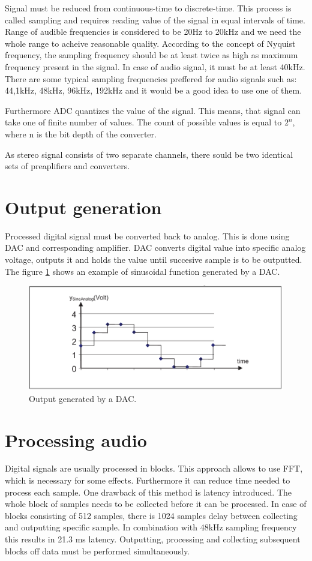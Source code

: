 \documentclass[a4paper,twoside,12pt]{book}
\begin{document}
Signal must be reduced from continuous-time to discrete-time.
This process is called sampling and requires reading value of the signal in equal intervals of time.
Range of audible frequencies is considered to be 20Hz to 20kHz
and we need the whole range to acheive reasonable quality.
According to the concept of Nyquist frequency, the sampling frequency should be at least
twice as high as maximum frequency present in the signal.
In case of audio signal, it must be at least 40kHz.
There are some typical sampling frequencies preffered for audio signals such as: 44,1kHz, 48kHz,
96kHz, 192kHz and it would be a good idea to use one of them.

Furthermore ADC quantizes the value of the signal.
This means, that signal can take one of finite number of values.
The count of possible values is equal to \(2^n\), where n is the bit depth of the converter.

As stereo signal consists of two separate channels,
there sould be two identical sets of preaplifiers and converters.

\section{Output generation}
Processed digital signal must be converted back to analog.
This is done using DAC and corresponding amplifier.
DAC converts digital value into specific analog voltage,
outputs it and holds the value until succesive sample is to be outputted.
The figure \ref{fig:sine} shows an example of sinusoidal
function generated by a DAC.

\begin{figure}[H]
    \centering
    \includegraphics[width=\textwidth]{images/DAC_sine}
    \caption{Output generated by a DAC\cite{ST:DAC2}.}
    \label{fig:sine}
\end{figure}

\section{Processing audio}
Digital signals are usually processed in blocks.
This approach allows to use FFT, which is necessary for some effects.
Furthermore it can reduce time needed to process each sample.
One drawback of this method is latency introduced.
The whole block of samples needs to be collected before it can be processed.
In case of blocks consisting of 512 samples,
there is 1024 samples delay between collecting and outputting specific sample.
In combination with 48kHz sampling frequency this results in 21.3 ms latency.
Outputting, processing and collecting subsequent blocks off data
must be performed simultaneously.
\end{document}
